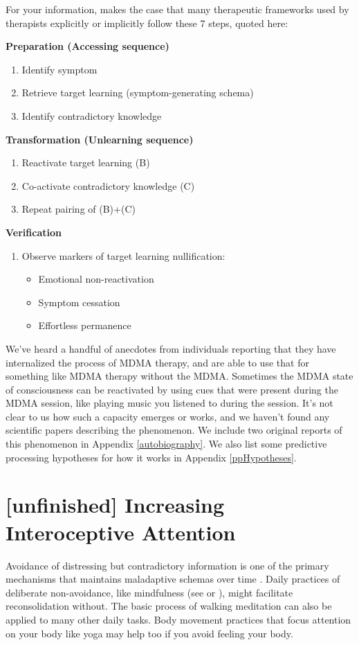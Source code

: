 \documentclass[12pt,letterpaper]{book}
\begin{document}
For your information, \textcite{eckerUnlocking} makes the case that many therapeutic frameworks used by therapists explicitly or implicitly follow these 7 steps, quoted here:

\noindent\textbf{Preparation (Accessing sequence)}
\begin{enumerate}
\renewcommand{\labelenumi}{\Alph{enumi}.}
    \item Identify symptom
    \item Retrieve target learning (symptom-generating schema)
    \item Identify contradictory knowledge
\end{enumerate}

\noindent\textbf{Transformation (Unlearning sequence)}
\begin{enumerate}
    \item Reactivate target learning (B)
    \item Co-activate contradictory knowledge (C)
    \item Repeat pairing of (B)+(C)
\end{enumerate}

\noindent\textbf{Verification}
\begin{enumerate}
    \renewcommand{\labelenumi}{V.}
    \item Observe markers of target learning nullification:
    \begin{itemize}
        \item Emotional non-reactivation
        \item Symptom cessation
        \item Effortless permanence
    \end{itemize}
\end{enumerate}

We've heard a handful of anecdotes from individuals reporting that they have internalized the process of MDMA therapy, and are able to use that for something like MDMA therapy without the MDMA. Sometimes the MDMA state of consciousness can be reactivated by using cues that were present during the MDMA session, like playing music you listened to during the session. It's not clear to us how such a capacity emerges or works, and we haven't found any scientific papers describing the phenomenon. We include two original reports of this phenomenon in Appendix \ref{autobiography}. We also list some predictive processing hypotheses for how it works in Appendix \ref{ppHypotheses}.
\section{[unfinished] Increasing Interoceptive Attention}
Avoidance of distressing but contradictory information is one of the primary mechanisms that maintains maladaptive schemas over time \cite{berghSelfEvidencing}. Daily practices of deliberate non-avoidance, like mindfulness (see \textcite{rain} or \textcite{walkingMeditation}), might facilitate reconsolidation without. The basic process of walking meditation can also be applied to many other daily tasks. Body movement practices that focus attention on your body like yoga may help too if you avoid feeling your body.
\end{document}

